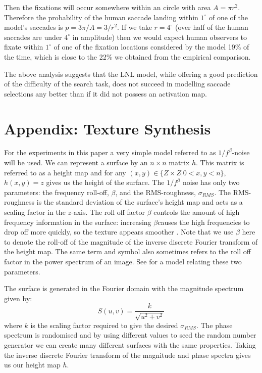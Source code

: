 \par
Then the fixations will occur somewhere within an circle with area $A=\pi r^2$. Therefore the probability of the human saccade landing within $1^{\circ}$ of one of the model's saccades is $p=3\pi/A=3/r^2$. If we take $r=4^{\circ}$ (over half of the human saccades are under $4^{\circ}$ in amplitude) then we would expect human observers to fixate within $1^{\circ}$ of one of the fixation locations considered by the model 19\% of the time, which is close to the 22\% we obtained from the empirical comparison. 
\par
The above analysis suggests that the LNL model, while offering a good prediction of the difficulty of the search task, does not succeed in modelling saccade selections any better than if it did not possess an activation map.

\section{Appendix: Texture Synthesis}
\label{appendix:synthesis}

For the experiments in this paper a very simple model referred to as $1/f^{\beta}$-noise will be used. We can represent a surface by an $n\times n$ matrix $h$. This matrix is referred to as a height map and for any $(x, y)\in\{Z\times Z | 0 < x, y < n\}$,$ h(x, y) = z$ gives us the height of the surface. The $1/f^{\beta}$ noise has only two parameters: the frequency roll-off, $\beta$, and the RMS-roughness, $\sigma_{RMS}$. The RMS-roughness is the standard deviation of the surface's height map and acts as a scaling factor in the $z$-axis. The roll off factor $\beta$ controls the amount of high frequency information in the surface: increasing $\beta$causes the high frequencies to drop off more quickly, so the texture appears smoother \citep{padilla2008}. Note that we use $\beta$ here to denote the roll-off of the magnitude of the inverse discrete Fourier transform of the height map. The same term and symbol also sometimes refers to the roll off factor in the power spectrum of an image. See \cite{chantler2005} for a model relating these two parameters. 
\par
The surface is generated in the Fourier domain with the magnitude spectrum given by:
\begin{equation}
S(u,v)=\frac{k}{\sqrt{u^2+v^2}}
\end{equation}
where $k$ is the scaling factor required to give the desired $\sigma_{RMS}$. The phase spectrum is randomised and by using different values to seed the random number generator we can create many different surfaces with the same properties. Taking the inverse discrete Fourier transform of the magnitude and phase spectra gives us our height map $h$.

